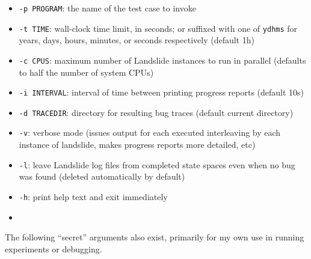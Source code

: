 \begin{itemize}
	\item {\tt -p PROGRAM}: the name of the test case to invoke
	\item {\tt -t TIME}: wall-clock time limit, in seconds; or suffixed with one of {\tt ydhms} for years, days, hours, minutes, or seconds respectively (default 1h)
	\item {\tt -c CPUS}: maximum number of Landslide instances to run in parallel (defaults to half the number of system CPUs)
	\item {\tt -i INTERVAL}: interval of time between printing progress reports (default 10s)
	\item {\tt -d TRACEDIR}: directory for resulting bug traces (default current directory)
	\item {\tt -v}: verbose mode (issues output for each executed interleaving by each instance of landslide, makes progress reports more detailed, etc)
	\item {\tt -l}: leave Landslide log files from completed state spaces even when no bug was found (deleted automatically by default)
	\item {\tt -h}: print help text and exit immediately
	\item {}
\end{itemize}

The following ``secret'' arguments also exist, primarily for my own use in running experiments or debugging.

